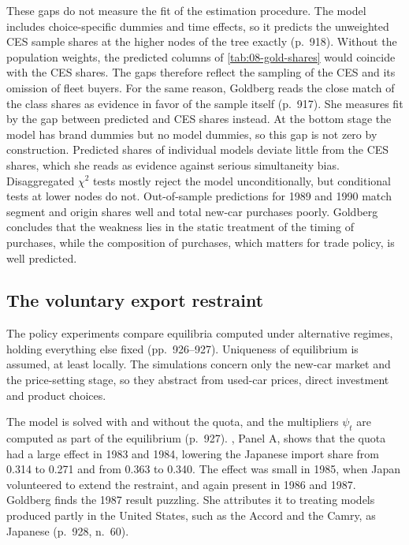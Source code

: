 These gaps do not measure the fit of the estimation procedure. The model includes choice-specific dummies and
time effects, so it predicts the unweighted CES sample shares at the higher nodes of the tree exactly (p.~918).
Without the population weights, the predicted columns of \cref{tab:08-gold-shares} would coincide with the CES
shares. The gaps therefore reflect the sampling of the CES and its omission of fleet buyers. For the same
reason, Goldberg reads the close match of the class shares as evidence in favor of the sample itself (p.~917).
She measures fit by the gap between predicted and CES shares instead. At the bottom stage the model has brand dummies but no model dummies, so this gap is not zero
by construction. Predicted shares of individual models deviate little
from the CES shares, which she reads as evidence against serious simultaneity bias. Disaggregated $\chi^2$ tests
\citep{Andrews1988} mostly reject the model unconditionally, but conditional tests at lower nodes do not.
Out-of-sample predictions for 1989 and 1990 match segment and origin shares well and total new-car purchases
poorly. Goldberg concludes that the weakness lies in the static treatment of the timing of purchases, while the
composition of purchases, which matters for trade policy, is well predicted.

\subsection{The voluntary export restraint}\label{sec:08-goldberg-ver}

The policy experiments compare equilibria computed under alternative regimes, holding everything else fixed
(pp.~926--927). Uniqueness of equilibrium is assumed, at least locally. The simulations concern only the
new-car market and the price-setting stage, so they abstract from used-car prices, direct investment and
product choices.

 The model is solved with and without the quota, and the multipliers
$\psi_t$ are computed as part of the equilibrium (p.~927). , Panel A, shows that the
quota had a large effect in 1983 and 1984, lowering the Japanese import share from 0.314 to 0.271 and from 0.363
to 0.340. The effect was small in 1985, when Japan volunteered to extend the restraint, and again present in
1986 and 1987. Goldberg finds the 1987 result puzzling. She attributes it to treating models produced partly in
the United States, such as the Accord and the Camry, as Japanese (p.~928, n.~60).

